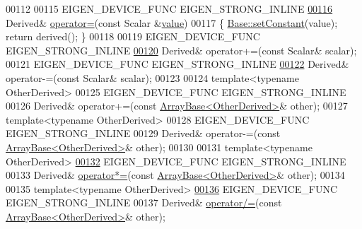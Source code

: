 \begin{DoxyCode}
00112     
00115     EIGEN\_DEVICE\_FUNC EIGEN\_STRONG\_INLINE
\hyperlink{group___core___module_aff99276e139d767dbe3bcb360d5710a3}{00116}     Derived& \hyperlink{group___core___module_aff99276e139d767dbe3bcb360d5710a3}{operator=}(\textcolor{keyword}{const} Scalar &\hyperlink{group___core___module_a8da735a6bfc7012606acf787156d10a0}{value})
00117     \{ \hyperlink{group___core___module_a19b2bc788277e9ab3f967a8857e290ae}{Base::setConstant}(value); \textcolor{keywordflow}{return} derived(); \}
00118 
00119     EIGEN\_DEVICE\_FUNC EIGEN\_STRONG\_INLINE
\hyperlink{group___core___module_a438640146f3e7488f09a4f60c305b1d9}{00120}     Derived& operator+=(\textcolor{keyword}{const} Scalar& scalar);
00121     EIGEN\_DEVICE\_FUNC EIGEN\_STRONG\_INLINE
\hyperlink{group___core___module_a3a548f8d340cd6eeb6aed77409725d88}{00122}     Derived& operator-=(\textcolor{keyword}{const} Scalar& scalar);
00123 
00124     \textcolor{keyword}{template}<\textcolor{keyword}{typename} OtherDerived>
00125     EIGEN\_DEVICE\_FUNC EIGEN\_STRONG\_INLINE
00126     Derived& operator+=(\textcolor{keyword}{const} \hyperlink{group___core___module_class_eigen_1_1_array_base}{ArrayBase<OtherDerived>}& other);
00127     \textcolor{keyword}{template}<\textcolor{keyword}{typename} OtherDerived>
00128     EIGEN\_DEVICE\_FUNC EIGEN\_STRONG\_INLINE
00129     Derived& operator-=(\textcolor{keyword}{const} \hyperlink{group___core___module_class_eigen_1_1_array_base}{ArrayBase<OtherDerived>}& other);
00130 
00131     \textcolor{keyword}{template}<\textcolor{keyword}{typename} OtherDerived>
\hyperlink{group___core___module_a91636e129a14395905c9bd76d7141c55}{00132}     EIGEN\_DEVICE\_FUNC EIGEN\_STRONG\_INLINE
00133     Derived& \hyperlink{group___core___module_a3fc54e548f88415c3582add526b62525}{operator*=}(\textcolor{keyword}{const} \hyperlink{group___core___module_class_eigen_1_1_array_base}{ArrayBase<OtherDerived>}& other);
00134 
00135     \textcolor{keyword}{template}<\textcolor{keyword}{typename} OtherDerived>
\hyperlink{group___core___module_a3ea6653e344e9233ccba8648ffc6389a}{00136}     EIGEN\_DEVICE\_FUNC EIGEN\_STRONG\_INLINE
00137     Derived& \hyperlink{group___core___module_a91860c840ac453449c1ac65fc61065f8}{operator/=}(\textcolor{keyword}{const} \hyperlink{group___core___module_class_eigen_1_1_array_base}{ArrayBase<OtherDerived>}& other);

\end{DoxyCode}

